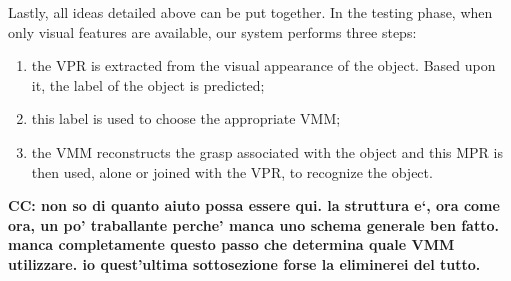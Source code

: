 Lastly, all ideas detailed above can be put together. In the testing
phase, when only visual features are available, our system performs three steps:

\begin{enumerate}

  \item the VPR is extracted from the visual appearance of the object. Based upon
    it, the label of the object is predicted;
  \item this label is used to choose the appropriate VMM;
  \item the VMM reconstructs the grasp associated with the object and this
    MPR is then used, alone or joined with the VPR, to recognize the object.

\end{enumerate}

\textbf{CC: non so di quanto aiuto possa essere qui. la struttura e`, ora come ora,
un po' traballante perche' manca uno schema generale ben fatto. manca completamente
questo passo che determina quale VMM utilizzare. io quest'ultima sottosezione forse
la eliminerei del tutto.}
